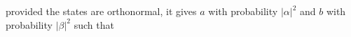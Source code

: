 \documentclass[preview]{standalone}
\begin{document}
\begin{center}
provided the states are orthonormal, it gives $a$ with probability $|\alpha|^2$ and $b$ with probability $|\beta|^2$ such that
\end{center}
\end{document}
